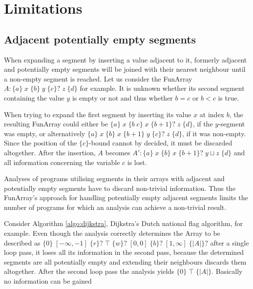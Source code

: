 \documentclass{report}
\newcommand{\funArray}[1]{$#1$}
\newcommand{\bound}[1]{\{#1\}}
\newcommand{\fvalue}[1]{\;#1\;}
\begin{document}
\section{Limitations}
\subsection{Adjacent potentially empty segments}
When expanding a segment by inserting a value adjacent to it, formerly adjacent and potentially empty segments will be joined with their nearest neighbour until a non-empty segment is reached. Let us consider the FunArray \funArray{A:\bound{a} \fvalue{x} \bound{b} \fvalue{y} \bound{c}? \fvalue{z} \bound{d}} for example. It is unknown whether its second segment containing the value $y$ is empty or not and thus whether $b=c$ or $b<c$ is true.

When trying to expand the first segment by inserting its value $x$ at index $b$, the resulting FunArray could either be \funArray{\bound{a} \fvalue{x} \bound{b\;c} \fvalue{x} \bound{b+1}? \fvalue{z} \bound{d}}, if the $y$-segment was empty, or alternatively \funArray{\bound{a} \fvalue{x} \bound{b} \fvalue{x} \bound{b+1} \fvalue{y} \bound{c}? \fvalue{z} \bound{d}}, if it was non-empty. Since the position of the \funArray{\bound{c}}-bound cannot by decided, it must be discarded altogether. After the insertion, $A$ becomes \funArray{A':\bound{a} \fvalue{x} \bound{b} \fvalue{x} \bound{b+1}? \fvalue{y\sqcup z} \bound{d}} and all information concerning the variable $c$ is lost.

 Analyses of programs utilising segments in their arrays with adjacent and potentially empty segments have to discard non-trivial information. Thus the FunArray's approach for handling potentially empty adjacent segments limits the number of programs for which an analysis can achieve a non-trivial result.
 
 Consider Algorithm \ref{algo:dijkstra}, Dijkstra's Dutch national flag algorithm, for example. Even though the analysis correctly determines the Array to be described as $\bound{0} \fvalue{[-\infty, -1]} \bound{r}? \fvalue{\top} \bound{w}? \fvalue{[0, 0]} \bound{b}? \fvalue{[1, \infty]}  \bound{|A|}?$ after a single loop pass, it loses all its information in the second pass, because the determined segments are all potentially empty and extending their neighbours discards them altogether. After the second loop pass the analysis yields $\bound{0} \fvalue{\top} \bound{|A|}$. Basically no information can be gained   
 
\end{document}
